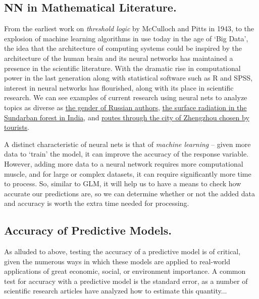 \documentclass[12pt]{article}\usepackage[]{graphicx}\usepackage[]{color}
\begin{document}
	\subsection{NN in Mathematical Literature.}
		From the earliest work on \textit{threshold logic} by McCulloch and Pitts in 1943, to the explosion of machine learning algorithms
in use today in the age of `Big Data', the idea that the architecture of computing systems could be inspired by the architecture of the human brain
and its neural networks has maintained a presence in the scientific literature.  With the dramatic rise in computational power in the last 
generation along with statistical software such as R and SPSS, interest in neural networks has flourished, along with its place in scientific
research.  We can see examples of current research using neural nets to analyze topics as diverse as 
\href{https://www.sciencedirect.com/science/article/pii/S1877050918300656}{the gender of Russian authors},
\href{https://www.sciencedirect.com/science/article/pii/S2468203916300024}{the surface radiation in the Sundarban forest in India}, and 
\href{https://www.sciencedirect.com/science/article/pii/S1877050917303617}{routes through the city of Zhengzhou chosen by tourists}.
		
A distinct characteristic of neural nets is that of \textit{machine learning} -- given more data to `train' the model, it can improve the accuracy
of the response variable.  However, adding more data to a neural network requires more computational muscle, and for large or complex datasets,
it can require significantly more time to process.  So, similar to GLM, it will help us to have a means to check how accurate our predictions are,
so we can determine whether or not the added data and accuracy is worth the extra time needed for processing.


	\subsection{Accuracy of Predictive Models.}
	As alluded to above, testing the accuracy of a predictive model is of critical, given the numerous ways in which these models are applied to real-world applications of great economic, social, or environment importance.  A common test for accuracy with a predictive model is the standard error, as a number of scientific research articles have analyzed how to estimate this quantity...
\end{document}
